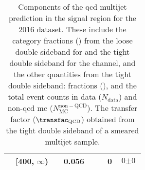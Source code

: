\begin{table}[htbp]
\begin{tabular*}{\linewidth}{@{\extracolsep{\fill}}llclcccr}
& [400, $\infty$) & & 0.056 & & & 0 & $\text{0} \pm \text{0}$ \\
\bottomrule
\end{tabular*}
\caption[Components of the \acrshort{qcd} multijet prediction in the signal region for the 2016 dataset]{Components of the \acrshort{qcd} multijet prediction in the signal region for the 2016 dataset. These include the category fractions (\catFraction) from the loose double sideband for \ttH and the tight double sideband for the \VH channel, and the other quantities from the tight double sideband: \ptmiss fractions (\metFraction), and the total event counts in data ($N_{\mathrm{data}}$) and non-\acrshort{qcd} \acrshort{mc} ($N_{\mathrm{MC}}^{\mathrm{non-QCD}}$). The transfer factor ($\transfac_{\mathrm{QCD}}$) obtained from the tight double sideband of a smeared multijet sample.}
\label{tab:htoinv_qcd_pred_2016}
\end{table}


